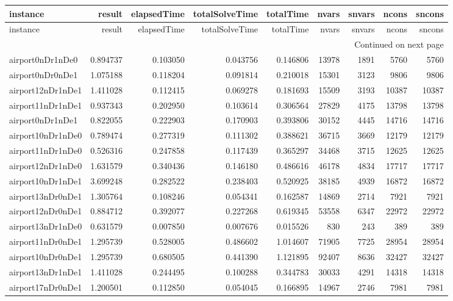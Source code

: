 
\begin{longtable}{|l|r|r|r|r|r|r|r|r|}
\toprule
instance & result & elapsedTime & totalSolveTime & totalTime & nvars & snvars & ncons & sncons \\
\midrule
\endfirsthead
\toprule
instance & result & elapsedTime & totalSolveTime & totalTime & nvars & snvars & ncons & sncons \\
\midrule
\endhead
\midrule
\multicolumn{9}{r}{Continued on next page} \\
\midrule
\endfoot
\bottomrule
\endlastfoot
airport0nDr1nDe0 & 0.894737 & 0.103050 & 0.043756 & 0.146806 & 13978 & 1891 & 5760 & 5760 \\
airport0nDr0nDe1 & 1.075188 & 0.118204 & 0.091814 & 0.210018 & 15301 & 3123 & 9806 & 9806 \\
airport12nDr1nDe1 & 1.411028 & 0.112415 & 0.069278 & 0.181693 & 15509 & 3193 & 10387 & 10387 \\
airport11nDr1nDe1 & 0.937343 & 0.202950 & 0.103614 & 0.306564 & 27829 & 4175 & 13798 & 13798 \\
airport0nDr1nDe1 & 0.822055 & 0.222903 & 0.170903 & 0.393806 & 30152 & 4445 & 14716 & 14716 \\
airport10nDr1nDe0 & 0.789474 & 0.277319 & 0.111302 & 0.388621 & 36715 & 3669 & 12179 & 12179 \\
airport11nDr1nDe0 & 0.526316 & 0.247858 & 0.117439 & 0.365297 & 34468 & 3715 & 12625 & 12625 \\
airport12nDr1nDe0 & 1.631579 & 0.340436 & 0.146180 & 0.486616 & 46178 & 4834 & 17717 & 17717 \\
airport10nDr1nDe1 & 3.699248 & 0.282522 & 0.238403 & 0.520925 & 38185 & 4939 & 16872 & 16872 \\
airport13nDr0nDe1 & 1.305764 & 0.108246 & 0.054341 & 0.162587 & 14869 & 2714 & 7921 & 7921 \\
airport12nDr0nDe1 & 0.884712 & 0.392077 & 0.227268 & 0.619345 & 53558 & 6347 & 22972 & 22972 \\
airport13nDr1nDe0 & 0.631579 & 0.007850 & 0.007676 & 0.015526 & 830 & 243 & 389 & 389 \\
airport11nDr0nDe1 & 1.295739 & 0.528005 & 0.486602 & 1.014607 & 71905 & 7725 & 28954 & 28954 \\
airport10nDr0nDe1 & 1.295739 & 0.680505 & 0.441390 & 1.121895 & 92407 & 8636 & 32427 & 32427 \\
airport13nDr1nDe1 & 1.411028 & 0.244495 & 0.100288 & 0.344783 & 30033 & 4291 & 14318 & 14318 \\
airport17nDr0nDe1 & 1.200501 & 0.112850 & 0.054045 & 0.166895 & 14967 & 2746 & 7981 & 7981 \\

\end{longtable}
